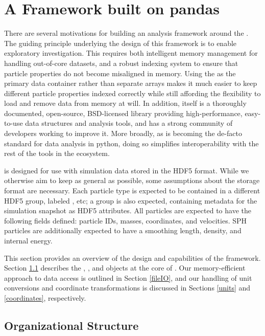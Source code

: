 \section{A Framework built on pandas}
\label{framework}

There are several motivations for building an analysis framework around the . 
The guiding principle underlying the design of this framework is to enable exploratory investigation.
This requires both intelligent memory management for handling out-of-core datasets, and a robust indexing system to ensure that particle properties do not become misaligned in memory.
Using  the  as the primary data container rather than separate  arrays makes it much easier to keep different particle properties indexed correctly while still affording the flexibility to load and remove data from memory at will.
In addition,  itself is a thoroughly documented, open-source, BSD-licensed library providing high-performance, easy-to-use data structures and analysis tools, and has a strong community of developers working to improve it.  
More broadly, as  is becoming the de-facto standard for data analysis in python, doing so simplifies interoperability with the rest of the tools in the ecosystem.

 is designed for use with simulation data stored in the HDF5 format.  
While we otherwise aim to keep  as general as possible, some assumptions about the storage format are necessary.
Each particle type is expected to be contained in a different HDF5 group, labeled , etc; a  group is also expected, containing metadata for the simulation snapshot as HDF5 attributes. 
All particles are expected to have the following fields defined: particle IDs, masses, coordinates, and velocities.  
SPH particles are additionally expected to have a smoothing length, density, and internal energy.  

This section provides an overview of the design and capabilities of the  framework.  
Section \ref{hierarchy} describes the , , and  objects at the core of .  
Our memory-efficient approach to data access is outlined in Section \ref{fileIO}, and our handling of unit conversions and coordinate transformations is discussed in Sections \ref{units} and \ref{coordinates}, respectively.

\subsection{Organizational Structure}
\label{hierarchy}

